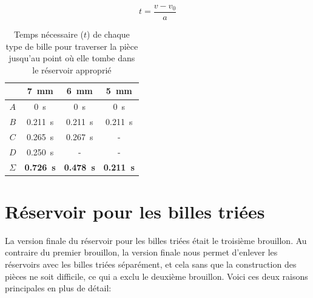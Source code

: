\begin{equation}
     t = \frac{v - v_{0}}{a}
     \label{eq:rolling_time}
\end{equation}

\begin{table}[htbp]
    \centering
    \begin{tabular}{|c|c|c|c|}
        \hline
         & \SI{7}{\mm} & \SI{6}{\mm} & \SI{5}{\mm} \\
        \hline
        $A$ & \SI{0}{\s} & \SI{0}{\s} & \SI{0}{\s} \\
        \hline
        $B$ & \SI{0.211}{\s} & \SI{0.211}{\s} & \SI{0.211}{\s} \\
        \hline
        $C$ & \SI{0.265}{\s} & \SI{0.267}{\s} & - \\
        \hline
        $D$ & \SI{0.250}{\s} & - & - \\
        \hline\hline
        $\Sigma$ & \textbf{\SI{0.726}{\s}} & \textbf{\SI{0.478}{\s}} & \textbf{\SI{0.211}{\s}} \\
        \hline
    \end{tabular}
    \caption{Temps nécessaire ($t$) de chaque type de bille pour traverser la pièce jusqu'au point où elle tombe dans le réservoir approprié}
    \label{tab:results_rolling_time}
\end{table}







\section{Réservoir pour les billes triées}
La version finale du réservoir pour les billes triées était le troisième brouillon. Au contraire du premier brouillon, la version finale nous permet d'enlever les réservoirs avec les billes triées séparément, et cela sans que la construction des pièces ne soit difficile, ce qui a exclu le deuxième brouillon. Voici ces deux raisons principales en plus de détail:

